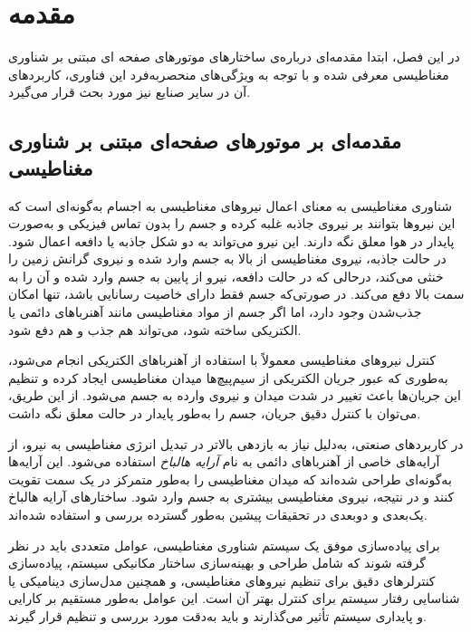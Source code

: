 
\chapter{مقدمه}
در این فصل، ابتدا مقدمه‌ای درباره‌ی ساختارهای موتورهای صفحه ای مبتنی بر شناوری مغناطیسی معرفی شده و با توجه به ویژگی‌های منحصربه‌فرد این فناوری، کاربردهای آن در سایر صنایع نیز مورد بحث قرار می‌گیرد.


\section{مقدمه‌ای بر موتورهای صفحه‌ای مبتنی‌ بر شناوری مغناطیسی}

شناوری مغناطیسی به معنای اعمال نیروهای مغناطیسی به اجسام به‌گونه‌ای است که این نیروها بتوانند بر نیروی جاذبه غلبه کرده و جسم را بدون تماس فیزیکی و به‌صورت پایدار در هوا معلق نگه ‌دارند. این نیرو می‌تواند به دو شکل جاذبه یا دافعه اعمال شود. در حالت جاذبه‌، نیروی مغناطیسی از بالا به جسم وارد شده و نیروی گرانش زمین را خنثی می‌کند، درحالی‌ که در حالت دافعه، نیرو از پایین به جسم وارد شده و آن را به سمت بالا دفع می‌کند. در صورتی‌که جسم فقط دارای خاصیت رسانایی باشد، تنها امکان جذب‌شدن وجود دارد، اما اگر جسم از مواد مغناطیسی مانند آهنرباهای دائمی یا الکتریکی ساخته شود، می‌تواند هم جذب و هم دفع شود.

کنترل نیروهای مغناطیسی معمولاً با استفاده از آهنرباهای الکتریکی انجام می‌شود، به‌طوری ‌که عبور جریان الکتریکی از سیم‌پیچ‌ها میدان مغناطیسی ایجاد کرده و تنظیم این جریان‌ها باعث تغییر در شدت میدان و نیروی وارده به جسم می‌شود. از این طریق، می‌توان با کنترل دقیق جریان، جسم را به‌طور پایدار در حالت معلق نگه داشت.

در کاربردهای صنعتی، به‌دلیل نیاز به بازدهی بالاتر در تبدیل انرژی مغناطیسی به نیرو، از آرایه‌های خاصی از آهنرباهای دائمی به نام 
\textit{آرایه هالباخ}
استفاده می‌شود. این آرایه‌ها به‌گونه‌ای طراحی شده‌اند که میدان مغناطیسی را به‌طور متمرکز در یک سمت تقویت کنند و در نتیجه، نیروی مغناطیسی بیشتری به جسم وارد شود. ساختارهای آرایه هالباخ یک‌بعدی و دوبعدی در تحقیقات پیشین به‌طور گسترده بررسی و استفاده شده‌اند.

برای پیاده‌سازی موفق یک سیستم شناوری مغناطیسی، عوامل متعددی باید در نظر گرفته شوند که شامل طراحی و بهینه‌سازی ساختار مکانیکی سیستم، پیاده‌سازی کنترلرهای دقیق برای تنظیم نیروهای مغناطیسی، و همچنین مدل‌سازی دینامیکی یا شناسایی رفتار سیستم برای کنترل بهتر آن است. این عوامل به‌طور مستقیم بر کارایی و پایداری سیستم تأثیر می‌گذارند و باید به‌دقت مورد بررسی و تنظیم قرار گیرند.

